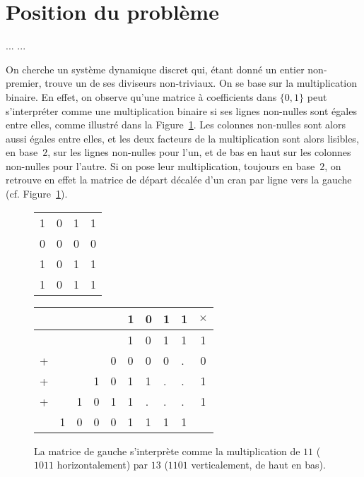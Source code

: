 \section{Position du problème}
\label{sec:introfacto}

...\cite{Pom96} \cite{BahiC06} \cite{Fat13}...



On cherche un système dynamique discret qui, étant donné un entier non-premier, trouve un de ses diviseurs non-triviaux. On se base sur la multiplication binaire. En effet, on observe qu'une matrice à coefficients dans $\{0,1\}$ peut s'interpréter comme une multiplication binaire si ses lignes non-nulles sont égales entre elles, comme illustré dans la Figure~\ref{fig:ExShift}. Les colonnes non-nulles sont alors aussi égales entre elles, et les deux facteurs de la multiplication sont alors lisibles, en base~$2$, sur les lignes non-nulles pour l'un, et de bas en haut sur les colonnes non-nulles pour l'autre. Si on pose leur multiplication, toujours en base~$2$, on retrouve en effet la matrice de départ décalée d'un cran par ligne vers la gauche (cf. Figure~\ref{fig:ExShift}).




\begin{figure}[h]
\centering
\begin{minipage}[]{0.25\linewidth}

\begin{tabular}{cccc}
1&0&1&1\\
0&0&0&0\\
1&0&1&1\\
1&0&1&1\\
\end{tabular}

\end{minipage}
\quad
\begin{minipage}[]{0.4\linewidth}


\begin{tabular}{lllllllll|c}
&&&&&1&0&1&1&$\times$\\
\hline
&&&&&1&0&1&1&1\\
+&&&&0&0&0&0&.&0 \\
+&&&1&0&1&1&.&.&1\\
+&&1&0&1&1&.&.&.&1\\
\hline
&1&0&0&0&1&1&1&1&\\
\end{tabular}
\end{minipage}
\caption{La matrice de gauche s'interprète comme la multiplication de $11$ ($1011$ horizontalement) par $13$ ($1101$ verticalement, de haut en bas).}
\label{fig:ExShift}
\end{figure}

